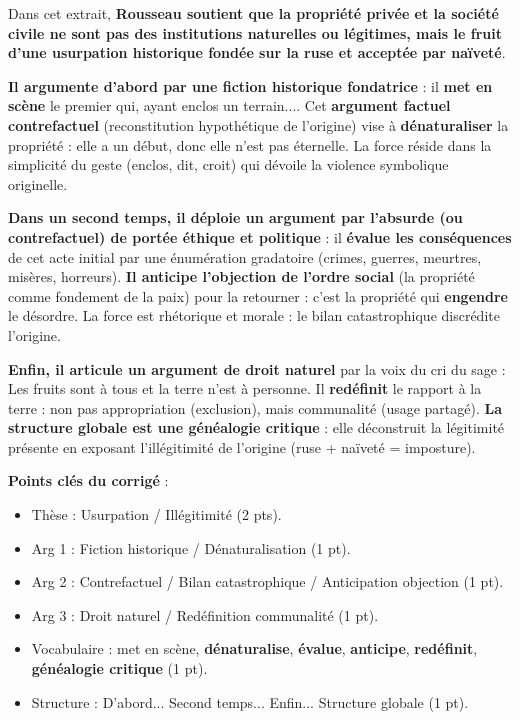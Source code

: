 \documentclass[11pt]{article}
\begin{document}
\begin{corrige}
\og{}Dans cet extrait, \textbf{Rousseau soutient que la propriété privée et la société civile ne sont pas des institutions naturelles ou légitimes, mais le fruit d'une usurpation historique fondée sur la ruse et acceptée par naïveté}.

\textbf{Il argumente d'abord par une fiction historique fondatrice} : il \textbf{met en scène} \og{}le premier qui, ayant enclos un terrain...\fg{}. Cet \textbf{argument factuel contrefactuel} (reconstitution hypothétique de l'origine) vise à \textbf{dénaturaliser} la propriété : elle a un début, donc elle n'est pas éternelle. La force réside dans la simplicité du geste (\og{}enclos\fg{}, \og{}dit\fg{}, \og{}croit\fg{}) qui dévoile la violence symbolique originelle.

\textbf{Dans un second temps, il déploie un argument par l'absurde (ou contrefactuel) de portée éthique et politique} : il \textbf{évalue les conséquences} de cet acte initial par une énumération gradatoire (\og{}crimes, guerres, meurtres, misères, horreurs\fg{}). \textbf{Il anticipe l'objection de l'ordre social} (la propriété comme fondement de la paix) pour la retourner : c'est la propriété qui \textbf{engendre} le désordre. La force est rhétorique et morale : le bilan catastrophique discrédite l'origine.

\textbf{Enfin, il articule un argument de droit naturel} par la voix du \og{}cri\fg{} du sage : \og{}Les fruits sont à tous et la terre n'est à personne\fg{}. Il \textbf{redéfinit} le rapport à la terre : non pas \og{}appropriation\fg{} (exclusion), mais \og{}communalité\fg{} (usage partagé). \textbf{La structure globale est une généalogie critique} : elle déconstruit la légitimité présente en exposant l'illégitimité de l'origine (ruse + naïveté = imposture).\fg{}

\tcblower
\textbf{Points clés du corrigé} :
\begin{itemize}
    \item Thèse : \og{}Usurpation / Illégitimité\fg{} (2 pts).
    \item Arg 1 : Fiction historique / Dénaturalisation (1 pt).
    \item Arg 2 : Contrefactuel / Bilan catastrophique / Anticipation objection (1 pt).
    \item Arg 3 : Droit naturel / Redéfinition communalité (1 pt).
    \item Vocabulaire : \og{}met en scène\fg{}, \textbf{dénaturalise}, \textbf{évalue}, \textbf{anticipe}, \textbf{redéfinit}, \textbf{généalogie critique} (1 pt).
    \item Structure : \og{}D'abord... Second temps... Enfin... Structure globale\fg{} (1 pt).
\end{itemize}
\end{corrige}
\end{document}
